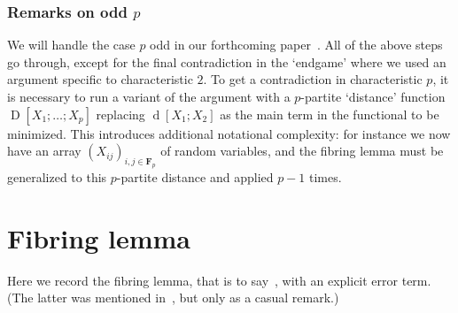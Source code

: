 \documentclass[12pt,reqno,tbtags]{amsart}
\theoremstyle{definition}
\theoremstyle{remark}
\newcommand\D{\operatorname{D}}
\def\F{\mathbf{F}}
\newcommand{\dist}[2]{{\operatorname{d}[#1;#2]}} %
\numberwithin{equation}{section}
\begin{document}
\subsubsection*{Remarks on odd $p$}
We will handle the case $p$ odd in our forthcoming paper~\cite{ggmt-pfr-odd}.
All of the above steps go through, except for the final contradiction in the `endgame' where we used an argument specific to characteristic $2$.
To get a contradiction in characteristic $p$, it is necessary to run a variant of the argument with a $p$-partite `distance' function $\D[X_1;\dots; X_p]$ replacing $\dist{X_1}{X_2}$ as the main term in the functional to be minimized.
This introduces additional notational complexity: for instance we now have an array $(X_{ij})_{i,j \in \F_p}$ of random variables, and the fibring lemma must be generalized to this $p$-partite distance and applied $p-1$ times.

\section{Fibring lemma}%
\label{sec4}
Here we record the fibring lemma, that is to say~\cite[Proposition 1.4]{gmt}, with an explicit error term.  (The latter was mentioned in~\cite{gmt}, but only as a casual remark.)
\end{document}
